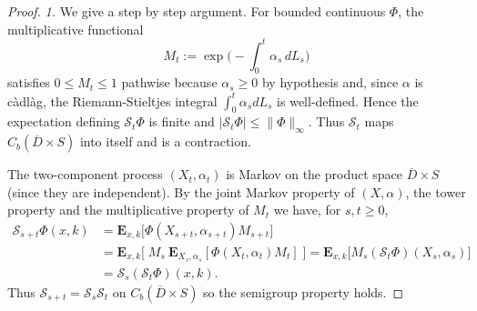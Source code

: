 \documentclass[11pt]{amsart}
\theoremstyle{plain}
\theoremstyle{definition}
\theoremstyle{remark}
\begin{document}
\begin{proof}
	\emph{1.} We give a step by step argument. For bounded continuous $\Phi$, the multiplicative functional
	\[
	M_t := \exp\Big(-\int_0^t \alpha_s\,dL_s\Big)
	\]
	satisfies $0\le M_t\le1$ pathwise because $\alpha_s\ge0$ by hypothesis and, since \(\alpha\) is c\`adl\`ag, the Riemann-Stieltjes integral $\int_0^t \alpha_s dL_s$ is well-defined. Hence the expectation defining $\mathcal S_t\Phi$ is finite and $|\mathcal S_t\Phi|\le\|\Phi\|_\infty$. Thus $\mathcal S_t$ maps $C_b(\overline D\times S)$ into itself and is a contraction.
	
	The two-component process $(X_t,\alpha_t)$ is Markov on the product space $\overline D\times S$ (since they are independent).
	By the joint Markov property of $(X,\alpha)$, the tower property and the multiplicative property of $M_t$ we have, for $s,t\ge0$,
	\[
	\begin{aligned}
		\mathcal S_{s+t}\Phi(x,k)
		&= \mathbf E_{x,k}\big[\Phi(X_{s+t},\alpha_{s+t})M_{s+t}\big] \\
		&= \mathbf E_{x,k}\big[\;M_s\ \mathbf E_{X_s,\alpha_s}[\Phi(X_t,\alpha_t)M_t]\;\big]
		= \mathbf E_{x,k}\big[M_s(\mathcal S_t\Phi)(X_s,\alpha_s)\big] \\
		&= \mathcal S_s(\mathcal S_t\Phi)(x,k).
	\end{aligned}
	\]
	Thus $\mathcal S_{s+t}=\mathcal S_s\mathcal S_t$ on $C_b(\overline D\times S)$ so the semigroup property holds.
	

\end{proof}
\end{document}
